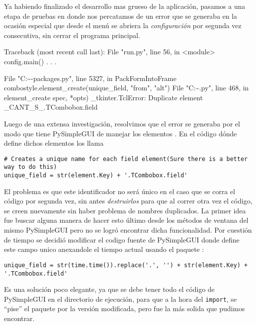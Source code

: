 
Ya habiendo finalizado el desarrollo mas grueso de la aplicación, pasamos a una etapa de pruebas en donde nos percatamos de un error que se generaba en la ocasión especial que desde el menú se abriera la \emph{configuración} por segunda vez consecutiva, sin cerrar el programa principal.
\begin{cverbatim}
Traceback (most recent call last):
  File "run.py", line 56, in <module>
    config.main()
        .
        .
        .
        
  File "C:\~\lib\site-packages\PPySimpleGUI\PySimpleGUI.py",
line 5327, in PackFormIntoFrame
    combostyle.element_create(unique_field, "from", "alt")
  File "C:\~\lib\tkinter\ttk.py", line 468, in element_create
    spec, *opts)
_tkinter.TclError: Duplicate element _CANT_S_.TCombobox.field
\end{cverbatim}

Luego de una extensa investigación, resolvimos que el error se generaba por el modo que tiene PySimpleGUI de manejar los elementos . En el código dónde define dichos elementos los llama   
\begin{verbatim}
# Creates a unique name for each field element(Sure there is a better way to do this)
unique_field = str(element.Key) + '.TCombobox.field'
\end{verbatim}
El problema es que este identificador no será único en el caso que se corra el código por segunda vez, sin antes \emph{destruirlos} para que al correr otra vez el código, se creen nuevamente sin haber problema de nombres duplicados.
La primer idea fue buscar alguna manera de hacer esto último desde los métodos de ventana del mismo PySimpleGUI pero no se logró encontrar dicha funcionalidad. Por cuestión de tiempo se decidió modificar el codigo fuente de PySimpleGUI donde define este campo unico anexandole el tiempo actual usando el paquete :
\begin{verbatim}
unique_field = str(time.time()).replace('.', '') + str(element.Key) + '.TCombobox.field'
\end{verbatim}
Es una solución poco elegante, ya que se debe tener todo el código de PySimpleGUI en el directorio de ejecución, para que a la hora del \texttt{import}, se ``pise'' el paquete por la versión modificada, pero fue la más solida que pudimos encontrar. 